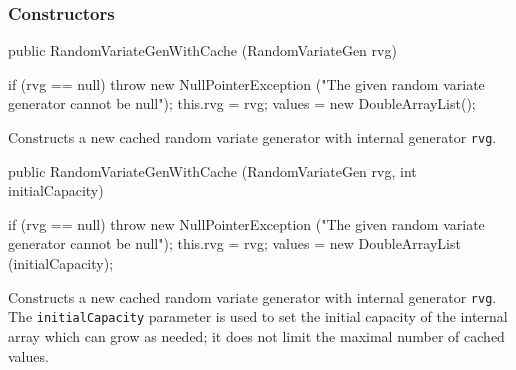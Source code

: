 \subsubsection* {Constructors}
\begin{code}

   public RandomVariateGenWithCache (RandomVariateGen rvg)\begin{hide} {
      if (rvg == null)
         throw new NullPointerException
            ("The given random variate generator cannot be null");
      this.rvg = rvg;
      values = new DoubleArrayList();
   }\end{hide}
\end{code}
\begin{tabb}   Constructs a new cached random variate generator with
 internal generator \texttt{rvg}.
\end{tabb}
\begin{htmlonly}
\end{htmlonly}
\begin{code}

   public RandomVariateGenWithCache (RandomVariateGen rvg,
                                     int initialCapacity)\begin{hide} {
      if (rvg == null)
         throw new NullPointerException
            ("The given random variate generator cannot be null");
      this.rvg = rvg;
      values = new DoubleArrayList (initialCapacity);
   }\end{hide}
\end{code}
\begin{tabb}   Constructs a new cached random variate generator
 with internal generator \texttt{rvg}.  The \texttt{initialCapacity}
 parameter is used to set the initial capacity of the internal array
 which can grow as needed; it does not limit the maximal
 number of cached values.
\end{tabb}
\begin{htmlonly}
\end{htmlonly}

